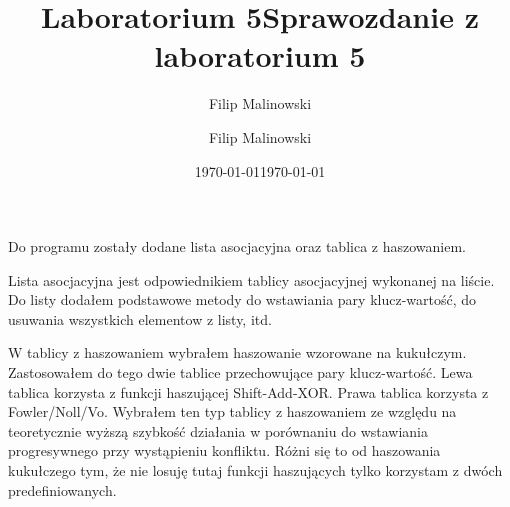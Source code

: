 \documentclass[a4paper,10pt]{scrartcl}
\title{Laboratorium 5}
\author{Filip Malinowski}
\date{\today}
\begin{document}
\title{Sprawozdanie z laboratorium 5}
\author{Filip Malinowski}
\date{\today}

\maketitle

Do programu zostały dodane lista asocjacyjna
oraz tablica z haszowaniem.

Lista asocjacyjna jest odpowiednikiem tablicy
asocjacyjnej wykonanej na liście. Do listy
dodałem podstawowe metody do wstawiania pary
klucz-wartość, do usuwania wszystkich elementow
z listy, itd.

W tablicy z haszowaniem wybrałem haszowanie
wzorowane na kukułczym. Zastosowałem do tego
dwie tablice przechowujące pary klucz-wartość.
Lewa tablica korzysta z funkcji haszującej
Shift-Add-XOR. Prawa tablica korzysta z
Fowler/Noll/Vo.
Wybrałem ten typ tablicy z haszowaniem
ze względu na teoretycznie wyższą szybkość
działania w porównaniu do wstawiania
progresywnego przy wystąpieniu konfliktu.
Różni się to od haszowania kukułczego tym,
że nie losuję tutaj funkcji haszujących
tylko korzystam z dwóch predefiniowanych.
\end{document}
